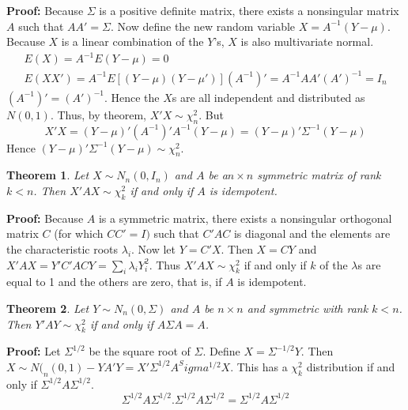 \documentclass{article}
\newtheorem{theorem}{Theorem}[section]
\begin{document}
\textbf{Proof:} Because \(\Sigma\) is a positive definite matrix, there exists a nonsingular matrix \(A\) such that \(AA'=\Sigma\). Now define the new random variable \(X=A^{-1}(Y-\mu)\). Because \(X\) is a linear combination of the \(Y\)'s, \(X\) is also multivariate normal.
\begin{equation*}
    \begin{split}
        E(X)=A^{-1}E(Y-\mu)=0\\
        E(XX')=A^{-1}E[(Y-\mu)(Y-\mu')](A^{-1})'=A^{-1}AA'(A')^{-1}=I_n
    \end{split}
\end{equation*}
\((A^{-1})'=(A')^{-1}\). Hence the \(X\)s are all independent and distributed as \(N(0,1)\). Thus, by theorem, \(X'X\sim\chi_n^2\). But
\begin{equation*}
    X'X=(Y-\mu)'(A^{-1})'A^{-1}(Y-\mu)=(Y-\mu)'\Sigma^{-1}(Y-\mu)
\end{equation*}
Hence \((Y-\mu)'\Sigma^{-1}(Y-\mu)\sim\chi_n^2\).

\begin{theorem}
    Let \(X\sim N_n(0,I_n)\) and \(A\) be a\(n \times n\) symmetric matrix of rank \(k<n\). Then \(X'AX\sim\chi_k^2\) if and only if \(A\) is idempotent.
\end{theorem}

\textbf{Proof:} Because \(A\) is a symmetric matrix, there exists a nonsingular orthogonal matrix \(C\) (for which \(CC'=I)\) such that \(C'AC\) is diagonal and the elements are the characteristic roots \(\lambda_i\). Now let \(Y=C'X\). Then \(X=CY\) and \(X'AX=Y'C'ACY=\sum_i \lambda_i Y_i^2\). Thus \(X'AX\sim\chi_k^2\) if and only if \(k\) of the \(\lambda\)s are equal to 1 and the others are zero, that is, if \(A\) is idempotent.

\begin{theorem}
    Let \(Y\sim N_n(0,\Sigma)\) and \(A\) be \(n \times n\) and symmetric with rank \(k<n\). Then \(Y'AY\sim\chi_k^2\) if and only if \(A\Sigma A=A\).
\end{theorem}

\textbf{Proof:} Let \(\Sigma^{1/2}\) be the square root of \(\Sigma\). Define \(X=\Sigma^{-1/2}Y\). Then \(X\sim N(_n(0,1)- YA'Y=X'\Sigma^{1/2}A^Sigma^{1/2}X\). This has a \(\chi_k^2\) distribution if and only if \(\Sigma^{1/2}A\Sigma^{1/2}\).
\begin{equation*}
    \Sigma^{1/2}A\Sigma^{1/2}.\Sigma^{1/2}A \Sigma^{1/2}=\Sigma^{1/2}A\Sigma^{1/2}
\end{equation*}
\end{document}
